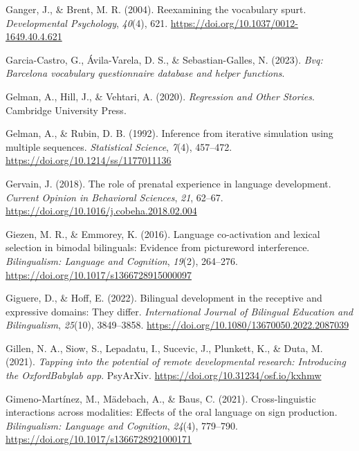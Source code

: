 \documentclass[
  12pt,
  b5paperpaper,
  twoside]{scrreprt}
\newlength{\cslhangindent}
\newlength{\cslentryspacingunit} %
\newenvironment{CSLReferences}[2] %
 {%
  \setlength{\parindent}{0pt}
  \ifodd #1
  \let\oldpar\par
  \def\par{\hangindent=\cslhangindent\oldpar}
  \fi
  \setlength{\parskip}{#2\cslentryspacingunit}
 }%
 {}
\begin{document}
\begin{CSLReferences}{1}{0}
\leavevmode{}%
Ganger, J., \& Brent, M. R. (2004). Reexamining the vocabulary spurt.
\emph{Developmental Psychology}, \emph{40}(4), 621.
\url{https://doi.org/10.1037/0012-1649.40.4.621}

\leavevmode{}%
Garcia-Castro, G., Ávila-Varela, D. S., \& Sebastian-Galles, N. (2023).
\emph{Bvq: Barcelona vocabulary questionnaire database and helper
functions}.

\leavevmode{}%
Gelman, A., Hill, J., \& Vehtari, A. (2020). \emph{Regression and {Other
Stories}}. {Cambridge University Press}.

\leavevmode{}%
Gelman, A., \& Rubin, D. B. (1992). Inference from iterative simulation
using multiple sequences. \emph{Statistical Science}, \emph{7}(4),
457--472. \url{https://doi.org/10.1214/ss/1177011136}

\leavevmode{}%
Gervain, J. (2018). The role of prenatal experience in language
development. \emph{Current Opinion in Behavioral Sciences}, \emph{21},
62--67. \url{https://doi.org/10.1016/j.cobeha.2018.02.004}

\leavevmode{}%
Giezen, M. R., \& Emmorey, K. (2016). Language co-activation and lexical
selection in bimodal bilinguals: Evidence from picture{\textendash}word
interference. \emph{Bilingualism: Language and Cognition}, \emph{19}(2),
264--276. \url{https://doi.org/10.1017/s1366728915000097}

\leavevmode{}%
Giguere, D., \& Hoff, E. (2022). Bilingual development in the receptive
and expressive domains: They differ. \emph{International Journal of
Bilingual Education and Bilingualism}, \emph{25}(10), 3849--3858.
\url{https://doi.org/10.1080/13670050.2022.2087039}

\leavevmode{}%
Gillen, N. A., Siow, S., Lepadatu, I., Sucevic, J., Plunkett, K., \&
Duta, M. (2021). \emph{Tapping into the potential of remote
developmental research: Introducing the {OxfordBabylab} app}.
{PsyArXiv}. \url{https://doi.org/10.31234/osf.io/kxhmw}

\leavevmode{}%
Gimeno-Martínez, M., Mädebach, A., \& Baus, C. (2021). Cross-linguistic
interactions across modalities: Effects of the oral language on sign
production. \emph{Bilingualism: Language and Cognition}, \emph{24}(4),
779--790. \url{https://doi.org/10.1017/s1366728921000171}


\end{CSLReferences}
\end{document}
